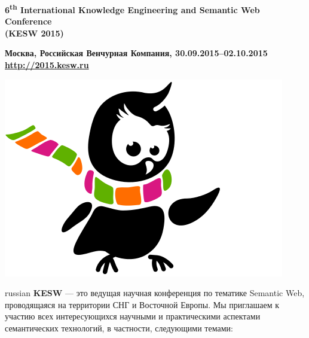 \documentclass[a4paper, 10pt]{article}
\newcommand{\rus}[1]{\foreignlanguage{russian}{#1}}
\renewcommand{\skip}{\vspace{1ex}}
\begin{document}
\begin{minipage}{.80\textwidth}
\begin{center}

\Large{\bf 6\textsuperscript{th} International Knowledge Engineering and Semantic Web Conference 
\\ (KESW 2015)}

\skip\skip

\large{\bf \rus{Москва, Российская Венчурная Компания}, 30.09.2015--02.10.2015 
\\
\url{http://2015.kesw.ru}}
\end{center}

\end{minipage}
\hfill
\begin{minipage}{.21\textwidth}

\includegraphics[width=\textwidth]{kesw}

\end{minipage}

\skip\skip

\begin{otherlanguage*}{russian}
\noindent
\textbf{KESW} --- это ведущая научная конференция по тематике Semantic Web,
проводящаяся на территории СНГ и Восточной Европы. Мы приглашаем к участию всех интересующихся научными и практическими аспектами семантических технологий, в частности, следующими темами:
\end{otherlanguage*}

\skip
\skip
\end{document}
